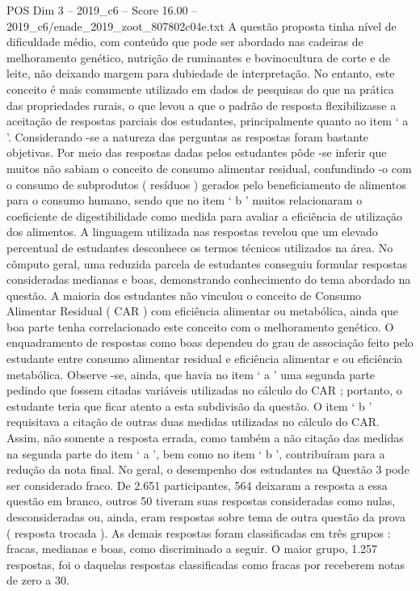 \begin{textsample}{POS Dim 3 – 2019\_c6 – Score 16.00 – 2019\_c6/enade\_2019\_zoot\_807802c04e.txt}
A questão proposta tinha nível de dificuldade médio, com conteúdo que pode ser abordado nas cadeiras de melhoramento genético, nutrição de ruminantes e bovinocultura de corte e de leite, não deixando margem para dubiedade de interpretação.
No entanto, este conceito é mais comumente utilizado em dados de pesquisas do que na prática das propriedades rurais, o que levou a que o padrão de resposta flexibilizasse a aceitação de respostas parciais dos estudantes, principalmente quanto ao item ‘ a ’.
Considerando -se a natureza das perguntas as respostas foram bastante objetivas.
Por meio das respostas dadas pelos estudantes pôde -se inferir que muitos não sabiam o conceito de consumo alimentar residual, confundindo -o com o consumo de subprodutos ( resíduos ) gerados pelo beneficiamento de alimentos para o consumo humano, sendo que no item ‘ b ’ muitos relacionaram o coeficiente de digestibilidade como medida para avaliar a eficiência de utilização dos alimentos.
A linguagem utilizada nas respostas revelou que um elevado percentual de estudantes desconhece os termos técnicos utilizados na área.
No cômputo geral, uma reduzida parcela de estudantes conseguiu formular respostas consideradas medianas e boas, demonstrando conhecimento do tema abordado na questão.
A maioria dos estudantes não vinculou o conceito de Consumo Alimentar Residual ( CAR ) com eficiência alimentar ou metabólica, ainda que boa parte tenha correlacionado este conceito com o melhoramento genético.
O enquadramento de respostas como boas dependeu do grau de associação feito pelo estudante entre consumo alimentar residual e eficiência alimentar e ou eficiência metabólica.
Observe -se, ainda, que havia no item ‘ a ’ uma segunda parte pedindo que fossem citadas variáveis utilizadas no cálculo do CAR ; portanto, o estudante teria que ficar atento a esta subdivisão da questão.
O item ‘ b ’ requisitava a citação de outras duas medidas utilizadas no cálculo do CAR.
Assim, não somente a resposta errada, como também a não citação das medidas na segunda parte do item ‘ a ’, bem como no item ‘ b ’, contribuíram para a redução da nota final.
No geral, o desempenho dos estudantes na Questão 3 pode ser considerado fraco.
De 2.651 participantes, 564 deixaram a resposta a essa questão em branco, outros 50 tiveram suas respostas consideradas como nulas, desconsideradas ou, ainda, eram respostas sobre tema de outra questão da prova ( resposta trocada ).
As demais respostas foram classificadas em três grupos : fracas, medianas e boas, como discriminado a seguir.
O maior grupo, 1.257 respostas, foi o daquelas respostas classificadas como fracas por receberem notas de zero a 30.

\end{textsample}
